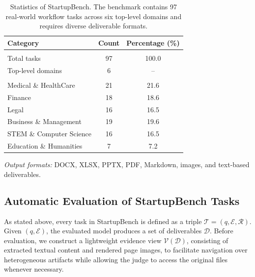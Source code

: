 \begin{table}[t]
\centering
\small
\setlength{\tabcolsep}{12pt}
\renewcommand{\arraystretch}{1.12}
\begin{threeparttable}
\caption{Statistics of StartupBench. The benchmark contains 97 real-world workflow tasks across six top-level domains and requires diverse deliverable formats.}
\label{tab:benchmark_statistics}

\begin{tabular}{l S[table-format=3.0] S[table-format=3.1]}
\toprule
\textbf{Category} & {\textbf{Count}} & {\textbf{Percentage (\%)}} \\
\midrule

 \\
Total tasks & 97 & 100.0 \\
Top-level domains & 6 &  \\

\midrule
{}
 \\
Medical \& HealthCare & 21 & 21.6 \\
Finance & 18 & 18.6 \\
Legal & 16 & 16.5 \\
Business \& Management & 19 & 19.6 \\
STEM \& Computer Science & 16 & 16.5 \\
Education \& Humanities & 7 & 7.2 \\

\bottomrule
\end{tabular}

\begin{tablenotes}[flushleft]
\footnotesize
\item \textit{Output formats:} DOCX, XLSX, PPTX, PDF, Markdown, images, and text-based deliverables.
\end{tablenotes}
\end{threeparttable}
\end{table}





\subsection{Automatic Evaluation of StartupBench Tasks}

As stated above, every task in StartupBench is defined as a triple $\mathcal{T}=(q,\mathcal{E},\mathcal{R})$. Given $(q,\mathcal{E})$, the evaluated model produces a set of deliverables $\mathcal{D}$. Before evaluation, we construct a lightweight evidence view $\mathcal{V}(\mathcal{D})$, consisting of extracted textual content and rendered page images, to facilitate navigation over heterogeneous artifacts while allowing the judge to access the original files whenever necessary.

